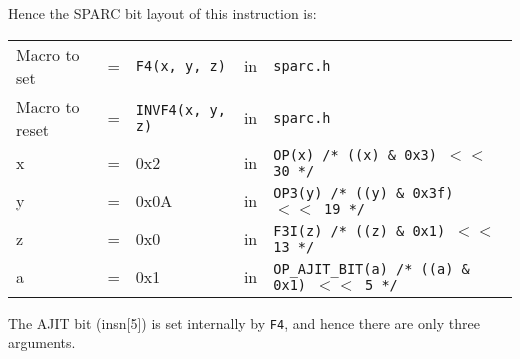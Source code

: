 \begin{enumerate}
  Hence the SPARC bit layout of this instruction is:

  \begin{tabular}[h]{lclcl}
    Macro to set  &=& \texttt{F4(x, y, z)} &in& \texttt{sparc.h}     \\
    Macro to reset  &=& \texttt{INVF4(x, y, z)} &in& \texttt{sparc.h}     \\
    x &=& 0x2      &in& \texttt{OP(x)  /* ((x) \& 0x3)  $<<$ 30 */} \\
    y &=& 0x0A     &in& \texttt{OP3(y) /* ((y) \& 0x3f) $<<$ 19 */} \\
    z &=& 0x0      &in& \texttt{F3I(z) /* ((z) \& 0x1)  $<<$ 13 */} \\
    a &=& 0x1      &in& \texttt{OP\_AJIT\_BIT(a) /* ((a) \& 0x1)  $<<$ 5 */}
  \end{tabular}

  The AJIT bit  (insn[5]) is set internally by  \texttt{F4}, and hence
  there are only three arguments.


\end{enumerate}
